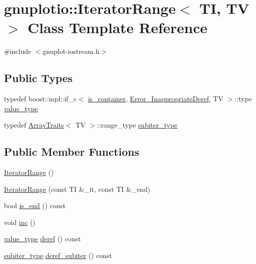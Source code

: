 \hypertarget{classgnuplotio_1_1_iterator_range}{}\section{gnuplotio\+:\+:Iterator\+Range$<$ TI, TV $>$ Class Template Reference}
\label{classgnuplotio_1_1_iterator_range}


{\ttfamily \#include $<$gnuplot-\/iostream.\+h$>$}

\subsection*{Public Types}
\begin{DoxyCompactItemize}
\item 
typedef boost\+::mpl\+::if\+\_\+c$<$ \hyperlink{classgnuplotio_1_1_iterator_range_a3f79d84bdf18761b6e49ae54d050f8ff}{is\+\_\+container}, \hyperlink{structgnuplotio_1_1_error___inappropriate_deref}{Error\+\_\+\+Inappropriate\+Deref}, TV $>$\+::type \hyperlink{classgnuplotio_1_1_iterator_range_a3d997739282df372a894c586c64a0687}{value\+\_\+type}
\item 
typedef \hyperlink{classgnuplotio_1_1_array_traits}{Array\+Traits}$<$ TV $>$\+::range\+\_\+type \hyperlink{classgnuplotio_1_1_iterator_range_a566ca30462a029f6df4ef16116f99acd}{subiter\+\_\+type}
\end{DoxyCompactItemize}
\subsection*{Public Member Functions}
\begin{DoxyCompactItemize}
\item 
\hyperlink{classgnuplotio_1_1_iterator_range_aa5789bb82a999548d3e5fc359a4c0c43}{Iterator\+Range} ()
\item 
\hyperlink{classgnuplotio_1_1_iterator_range_adb89135fc292dfc5152120bc7fe6135e}{Iterator\+Range} (const TI \&\+\_\+it, const TI \&\+\_\+end)
\item 
bool \hyperlink{classgnuplotio_1_1_iterator_range_a966a08441bdd5f5e76e37ef06f507ad7}{is\+\_\+end} () const
\item 
void \hyperlink{classgnuplotio_1_1_iterator_range_a369f392a561011f8f1c93d13fd976878}{inc} ()
\item 
\hyperlink{classgnuplotio_1_1_iterator_range_a3d997739282df372a894c586c64a0687}{value\+\_\+type} \hyperlink{classgnuplotio_1_1_iterator_range_a516ffb8c3716ef5e30f067b595f7dbfb}{deref} () const
\item 
\hyperlink{classgnuplotio_1_1_iterator_range_a566ca30462a029f6df4ef16116f99acd}{subiter\+\_\+type} \hyperlink{classgnuplotio_1_1_iterator_range_a34ef78d431ad8a643d412851016b2122}{deref\+\_\+subiter} () const
\end{DoxyCompactItemize}
